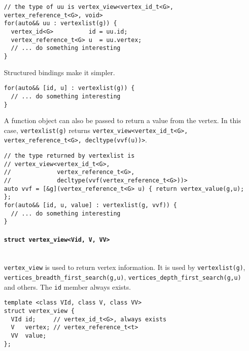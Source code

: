 \documentclass[10pt,onecolumn]{article}
\newcommand{\tcode}[1]{\lstinline[breaklines=true]{#1}}
\begin{document}
\begin{lstlisting}
// the type of uu is vertex_view<vertex_id_t<G>, vertex_reference_t<G>, void>
for(auto&& uu : vertexlist(g)) {
  vertex_id<G>          id = uu.id;
  vertex_reference_t<G> u  = uu.vertex;
  // ... do something interesting
}
\end{lstlisting}

Structured bindings make it simpler.
\begin{lstlisting}
for(auto&& [id, u] : vertexlist(g)) {
  // ... do something interesting
}
\end{lstlisting}

A function object can also be passed to return a value from the vertex. In this case, \tcode{vertexlist(g)} returns \tcode{vertex_view<vertex_id_t<G>, vertex_reference_t<G>, decltype(vvf(u))>}.
\begin{lstlisting}
// the type returned by vertexlist is 
// vertex_view<vertex_id_t<G>, 
//             vertex_reference_t<G>, 
//             decltype(vvf(vertex_reference_t<G>))>
auto vvf = [&g](vertex_reference_t<G> u) { return vertex_value(g,u); };
for(auto&& [id, u, value] : vertexlist(g, vvf)) {
  // ... do something interesting
}
\end{lstlisting}

\paragraph{\tcode{struct vertex_view<Vid, V, VV>}}\label{vertex-view}\mbox{} \\
\tcode{vertex_view} is used to return vertex information. It is used by \tcode{vertexlist(g)}, \tcode{vertices_breadth_first_search(g,u)}, \tcode{vertices_depth_first_search(g,u)} and others. The \tcode{id} member always exists.

\begin{lstlisting}
template <class VId, class V, class VV>
struct vertex_view {
  VId id;     // vertex_id_t<G>, always exists
  V   vertex; // vertex_reference_t<t>
  VV  value;
};
\end{lstlisting}
\end{document}
